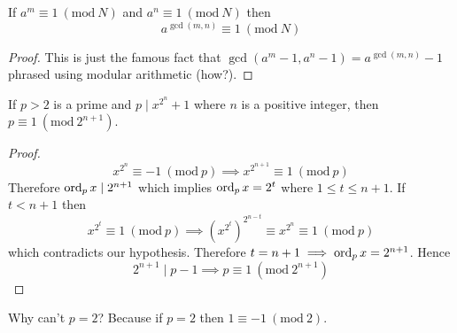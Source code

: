 \documentclass[11pt,numbers=noenddot,svgnames,dvipsnames]{scrartcl}
\renewcommand{\pmod}[1]{\ (\mathrm{mod}\ #1)}
\begin{document}
\begin{lemma}
    If $a^{m} \equiv 1 \pmod N$ and $a^{n} \equiv 1 \pmod N$ then 
    \[
        a^{\gcd(m, n)} \equiv 1 \pmod N
    \]
\end{lemma}
\begin{proof}
    This is just the famous fact that $\gcd(a^{m} - 1, a^{n} - 1) = a^{\gcd(m, n)} - 1$ 
    phrased using modular arithmetic (how?). 
\end{proof}

\begin{lemma}
    If $p > 2$ is a prime and $p \mid x^{2^{n}} + 1$ where 
    $n$ is a positive integer, then $p \equiv 1 \pmod{2^{n + 1}}$.
\end{lemma}
\begin{proof}
    \[
        x^{2^{n}} \equiv -1 \pmod p \implies x^{2^{n + 1}} \equiv 1 \pmod p
    \]
    Therefore $\operatorname{ord}_{p} x \mid 2^{n + 1}$ which implies $\operatorname{ord}_{p} x = 2^{t}$ where 
    $1 \leq t \leq n + 1$. If $t < n + 1$ then 
    \[
        x^{2^{t}} \equiv 1 \pmod p \implies \left(x^{2^{t}}\right)^{2^{n - t}} \equiv x^{2^{n}} \equiv 1 \pmod p
    \]
    which contradicts our hypothesis. Therefore $t = n+1 \implies \operatorname{ord}_{p} x = 2^{n + 1}$. Hence 
    \[
        2^{n+1}\mid p-1 \implies p \equiv 1 \pmod{2^{n+1}}
    \]
\end{proof}

\begin{remark}
    Why can't $p = 2$? Because if $p = 2$ then $ 1 \equiv -1 \pmod 2$.
\end{remark}
\end{document}

